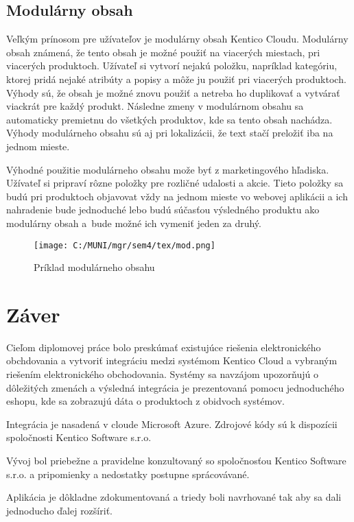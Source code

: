 \documentclass[
  printed, %
  table,   %
  lof,     %
  nolot,     %
  twoside,  
]{fithesis3}
\begin{document}
\section{Modulárny obsah}
Veľkým prínosom pre užívateľov je modulárny obsah Kentico Cloudu. Modulárny obsah známená, že tento obsah je možné použiť na viacerých miestach, pri viacerých produktoch. Užívateľ si vytvorí nejakú položku, napríklad kategóriu, ktorej pridá nejaké atribúty a popisy a môže ju použiť pri viacerých produktoch. Výhody sú, že obsah je možné znovu použiť a netreba ho duplikovať a vytvárať viackrát pre každý produkt. Následne zmeny v modulárnom obsahu sa automaticky premietnu do všetkých produktov, kde sa tento obsah nachádza. 
Výhody modulárneho obsahu sú aj pri lokalizácii, že text stačí preložiť iba na jednom mieste.

Výhodné použitie modulárneho obsahu može byť z marketingového hľadiska. Užívateľ si pripraví rôzne položky pre rozličné udalosti a akcie. Tieto položky sa budú pri produktoch objavovat vždy na jednom mieste vo webovej aplikácii a ich nahradenie bude jednoduché lebo budú súčasťou výsledného produktu ako modulárny obsah a~bude možné ich vymeniť jeden za druhý.

\begin{figure}[h]
  \begin{center}
        \texttt{[image: C:/MUNI/mgr/sem4/tex/mod.png]}
  \end{center}
  \caption{ Príklad modulárneho obsahu \cite{kcdash}}
  \label{fig:modular}
\end{figure}

\chapter{Záver}
Cieľom diplomovej práce bolo preskúmať existujúce riešenia elektronického obchdovania a vytvoriť integráciu medzi systémom Kentico Cloud a vybraným riešením elektronického obchodovania. Systémy sa navzájom upozorňujú o dôležitých zmenách a výsledná integrácia je prezentovaná pomocu jednoduchého eshopu, kde sa zobrazujú dáta o produktoch z obidvoch systémov.

Integrácia je nasadená v cloude Microsoft Azure. Zdrojové kódy sú k dispozícii spoločnosti Kentico Software s.r.o. 

Vývoj bol priebežne a pravidelne konzultovaný so spoločnosťou Kentico Software s.r.o. a pripomienky a nedostatky postupne sprácovávané.

Aplikácia je dôkladne zdokumentovaná a triedy boli navrhované tak aby sa dali jednoducho ďalej rozšíriť.
\end{document}
